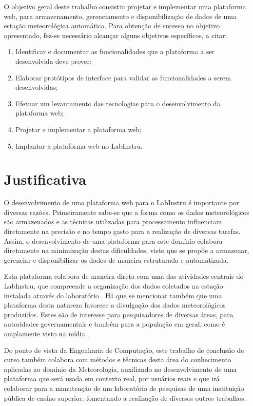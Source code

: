 O objetivo geral deste trabalho consistiu projetar e implementar uma plataforma web, para armazenamento, gerenciamento e disponibilização de dados de uma estação meteorológica automática. Para obtenção de sucesso no objetivo apresentado, fez-se necessário alcançar alguns objetivos específicos, a citar:

\begin{enumerate}
	\item Identificar e documentar as funcionalidades que a plataforma a ser desenvolvida deve prover;
	\item Elaborar protótipos de interface para validar as funcionalidades a serem desenvolvidas;
	\item Efetuar um levantamento das tecnologias para o desenvolvimento da plataforma web;
	\item Projetar e implementar a plataforma web;
	\item Implantar a plataforma web no LabInstru.
\end{enumerate}

\section{Justificativa}

O desenvolvimento de uma plataforma web para o LabInstru é importante por diversas razões. Primeiramente sabe-se que a forma como os dados meteorológicos são armazenados e as técnicas utilizadas para processamento influenciam diretamente na precisão e no tempo gasto para a realização de diversas tarefas. Assim, o desenvolvimento de uma plataforma para este domínio colabora diretamente na minimização destas dificuldades, visto que se propõe a  armazenar, gerenciar e disponibilizar os dados de maneira estruturada e automatizada.

Esta plataforma colabora de maneira direta com uma das atividades centrais do LabInstru, que compreende a organização dos dados coletados na estação instalada através do laboratório \cite{Labinstru:EST}. Há que se mencionar também que uma plataforma desta natureza favorece a divulgação dos dados meteorológicos produzidos. Estes são de interesse para pesquisadores de diversas áreas, para autoridades governamentais e também para a população em geral, como é amplamente visto na mídia.

Do ponto de vista da Engenharia de Computação, este trabalho de conclusão de curso também colabora com métodos e técnicas desta área do conhecimento aplicadas ao domínio da Meteorologia, auxiliando no desenvolvimento de uma plataforma que será usada em contexto real, por usuários reais e que irá colaborar para a manutenção de um laboratório de pesquisas de uma instituição pública de ensino superior, fomentando a realização de diversos outros trabalhos.

